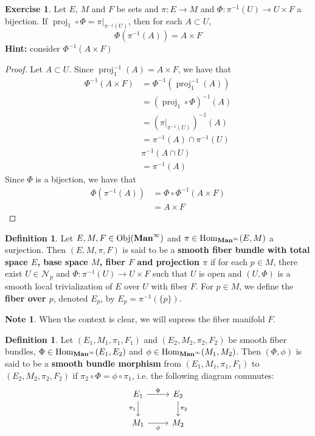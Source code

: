 \documentclass{book}
\theoremstyle{definition}
\newtheorem{defn}[definition]{Definition}
\newtheorem{note}[definition]{Note}
\newtheorem{ex}[definition]{Exercise}
\newcommand{\MN}{\mathcal{N}}
\DeclareMathOperator{\Obj}{Obj}
\DeclareMathOperator{\Hom}{Hom}
\DeclareMathOperator{\prj}{\text{proj}}
\DeclareMathOperator*{\Maninf}{\text{\tbf{Man}}^{\infty}}
\DeclareMathOperator*{\0}{\mbf{0}}
\DeclareMathOperator*{\1}{\mbf{1}}
\newcommand{\tbf}[1]{\textbf{#1}}
\begin{document}
	\begin{ex}
		Let $E$, $M$ and $F$ be sets and $\pi: E \rightarrow M$ and $\Phi: \pi^{-1}(U) \rightarrow U \times F$ a bijection. If $\prj_1 \circ \Phi = \pi|_{\pi^{-1}(U)}$, then for each $A \subset U$, $$\Phi( \pi^{-1}(A)) = A \times F$$
		\tbf{Hint:} consider $\Phi^{-1}(A \times F)$ 
	\end{ex}
	
	\begin{proof}
		Let $A \subset U$. Since $\prj_1^{-1}(A) = A \times F$, we have that 
		\begin{align*}
			\Phi^{-1}(A \times F)
			& = \Phi^{-1}(\prj_1^{-1}(A)) \\
			& = (\prj_1 \circ \Phi)^{-1}(A) \\
			& = (\pi|_{\pi^{-1}(U)})^{-1}(A) \\
			& = \pi^{-1}(A) \cap \pi^{-1}(U) \\
			&  \pi^{-1}(A \cap U) \\
			& = \pi^{-1}(A)
		\end{align*}
		Since $\Phi$ is a bijection, we have that
		\begin{align*}
			\Phi (\pi^{-1}(A))
			&= \Phi \circ \Phi^{-1}(A \times F) \\
			&= A \times F
		\end{align*}
	\end{proof}

	\begin{defn}
		Let $E,M, F \in\Obj( \Maninf)$ and $\pi \in \Hom_{\Maninf}(E, M)$ a surjection. Then $(E, M, \pi, F)$ is said to be a \tbf{smooth fiber bundle with total space $E$, base space $M$, fiber $F$ and projection $\pi$} if for each $p \in M$, there exist $U \in \MN_p$ and $\Phi: \pi^{-1}(U) \rightarrow U \times F$ such that $U$ is open and $(U, \Phi)$ is a smooth local trivialization of $E$ over $U$ with fiber $F$. For $p \in M$, we define the \tbf{fiber over $p$}, denoted $E_p$, by $E_p = \pi^{-1}(\{p\})$.
	\end{defn}

	\begin{note}
		When the context is clear, we will supress the fiber manifold $F$.
	\end{note}

	\begin{defn}
		Let $(E_1, M_1, \pi_1, F_1)$ and $(E_2, M_2, \pi_2, F_2)$ be smooth fiber bundles, $\Phi \in \Hom_{\Maninf}(E_1, E_2)$ and $\phi \in \Hom_{\Maninf}(M_1, M_2)$. Then $(\Phi, \phi)$ is said to be a \tbf{smooth bundle morphism} from $(E_1, M_1, \pi_1, F_1)$ to $(E_2, M_2, \pi_2, F_2)$ if 
		$\pi_2 \circ \Phi = \phi \circ \pi_1$, 
		i.e. the following diagram commutes:
		\[ 
		\begin{tikzcd}
			E_1 \arrow[r, "\Phi"] \arrow[d, "\pi_1"'] & E_2  \arrow[d, "\pi_2"] \\
			M_1 \arrow[r, "\phi"']                  & M_2
		\end{tikzcd}
		\] 
	\end{defn}
	
\end{document}
